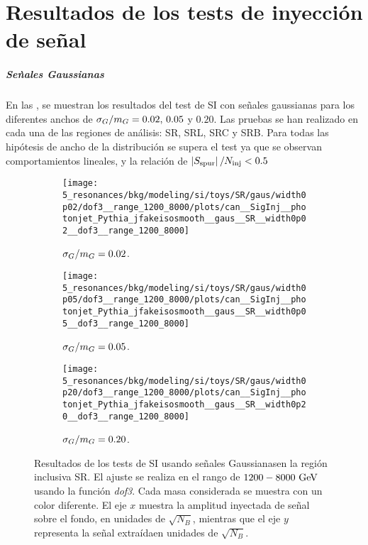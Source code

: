 \chapter{Resultados de los tests de inyecci\'on de se\~nal}
\label{app:si_results}


\paragraph{Se\`nales Gaussianas}

En las \Figrange{\ref{fig:si_results:siginj_gaus_SR}}{\ref{fig:si_results:siginj_gaus_SRB}}, se muestran los resultados del test de \ac{SI} con señales gaussianas para los diferentes anchos de \(\sigma_G/m_{G} = 0.02, \, 0.05\) y \(0.20\). Las pruebas se han realizado en cada una de las regiones de análisis: SR, SRL, SRC y SRB. Para todas las hipótesis de ancho de la distribuci\'on se supera el test ya que se observan comportamientos lineales, y la relación de \(\left|S_{\text{spur}}\right| / N_{\text{inj}} < 0.5\)


\begin{figure}[ht!]
    \centering
    \begin{subfigure}[h]{0.32\linewidth}
        \centering
        \texttt{[image: 5\_resonances/bkg/modeling/si/toys/SR/gaus/width0p02/dof3\_\_range\_1200\_8000/plots/can\_\_SigInj\_\_photonjet\_Pythia\_jfakeisosmooth\_\_gaus\_\_SR\_\_width0p02\_\_dof3\_\_range\_1200\_8000]}
        \caption{\(\sigma_G/m_{G} = 0.02\).}
    \end{subfigure}
    \hfill
    \begin{subfigure}[h]{0.32\linewidth}
        \centering
        \texttt{[image: 5\_resonances/bkg/modeling/si/toys/SR/gaus/width0p05/dof3\_\_range\_1200\_8000/plots/can\_\_SigInj\_\_photonjet\_Pythia\_jfakeisosmooth\_\_gaus\_\_SR\_\_width0p05\_\_dof3\_\_range\_1200\_8000]}
        \caption{\(\sigma_G/m_{G} = 0.05\).}
    \end{subfigure}
    \hfill
    \begin{subfigure}[h]{0.32\linewidth}
        \centering
        \texttt{[image: 5\_resonances/bkg/modeling/si/toys/SR/gaus/width0p20/dof3\_\_range\_1200\_8000/plots/can\_\_SigInj\_\_photonjet\_Pythia\_jfakeisosmooth\_\_gaus\_\_SR\_\_width0p20\_\_dof3\_\_range\_1200\_8000]}
        \caption{\(\sigma_G/m_{G} = 0.20\).}
    \end{subfigure}
    \caption{Resultados de los tests de \ac{SI} usando se\~nales Gaussianasen la regi\'on inclusiva SR. El ajuste se realiza en el rango de \(1200-8000~\text{GeV}\) usando la funci\'on \textit{dof3}. Cada masa considerada se muestra con un color diferente. El eje \(x\) muestra la amplitud inyectada de se\~nal sobre el fondo, en unidades de \(\sqrt{N_B}\), mientras que el eje \(y\) representa la se\~nal extra\'idaen unidades de \(\sqrt{N_B}\).}
    \label{fig:si_results:siginj_gaus_SR}
\end{figure}

